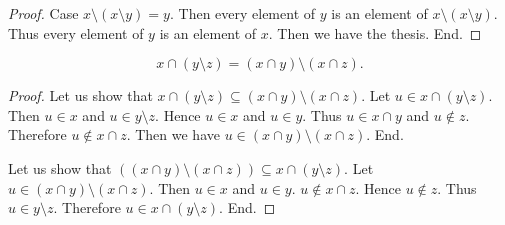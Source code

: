\documentclass[../../set-theory.tex]{subfiles}
\begin{document}
\begin{forthel}
\begin{proof}
      Case $x \setminus (x \setminus y) = y$.
        Then every element of $y$ is an element of $x \setminus
        (x \setminus y)$.
        Thus every element of $y$ is an element of $x$.
        Then we have the thesis.
      End.
    \end{proof}

    \begin{proposition}\label{SetTheory_01_01_878796}
      \[ x \cap (y \setminus z) = (x \cap y) \setminus (x \cap z). \]
    \end{proposition}
    \begin{proof}
      Let us show that $x \cap (y \setminus z) \subseteq (x \cap y) \setminus (x \cap z)$.
        Let $u \in x \cap (y \setminus z)$.
        Then $u \in x$ and $u \in y \setminus z$.
        Hence $u \in x$ and $u \in y$.
        Thus $u \in x \cap y$ and $u \notin z$.
        Therefore $u \notin x \cap z$.
        Then we have $u \in (x \cap y) \setminus (x \cap z)$.
      End.

      Let us show that $((x \cap y) \setminus (x \cap z)) \subseteq x \cap (y \setminus z)$.
        Let $u \in (x \cap y) \setminus (x \cap z)$.
        Then $u \in x$ and $u \in y$.
        $u \notin x \cap z$.
        Hence $u \notin z$.
        Thus $u \in y \setminus z$.
        Therefore $u \in x \cap (y \setminus z)$.
      End.
    \end{proof}
  \end{forthel}
\end{document}
